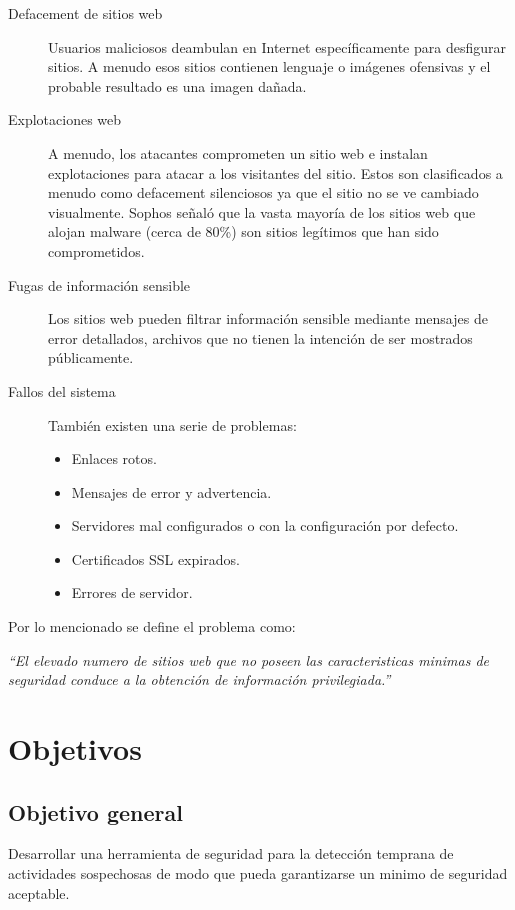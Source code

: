 \documentclass[letter,twoside,11pt]{article}
\begin{document}
\begin{description}
    \item [Defacement de sitios web] Usuarios maliciosos deambulan en Internet
        específicamente para desfigurar sitios. A menudo esos sitios contienen
        lenguaje o imágenes ofensivas y el probable resultado es una imagen
        dañada.
    \item [Explotaciones web] A menudo, los atacantes comprometen un sitio web e
        instalan explotaciones para atacar a los visitantes del sitio. Estos son
        clasificados a menudo como defacement silenciosos ya que el sitio no se
        ve cambiado visualmente. Sophos señaló que la vasta mayoría de los
        sitios web que alojan malware (cerca de 80\%) son sitios legítimos que
        han sido comprometidos.
    \item [Fugas de información sensible] Los sitios web pueden filtrar
        información sensible mediante mensajes de error detallados, archivos que
        no tienen la intención de ser mostrados públicamente.
    \item [Fallos del sistema] También existen una serie de problemas:
        \begin{itemize}
        \item Enlaces rotos.
        \item Mensajes de error y advertencia.
        \item Servidores mal configurados o con la configuración por defecto.
        \item Certificados SSL expirados.
        \item Errores de servidor.
        \end{itemize}
\end{description}

Por lo mencionado se define el problema como:

\emph{“El elevado numero de sitios web que no poseen las caracteristicas minimas
de seguridad conduce a la obtención de información privilegiada.”}

\section{Objetivos}

\subsection{Objetivo general}

Desarrollar una herramienta de seguridad para la detección temprana de
actividades sospechosas de modo que pueda garantizarse un minimo de seguridad
aceptable.
\end{document}
